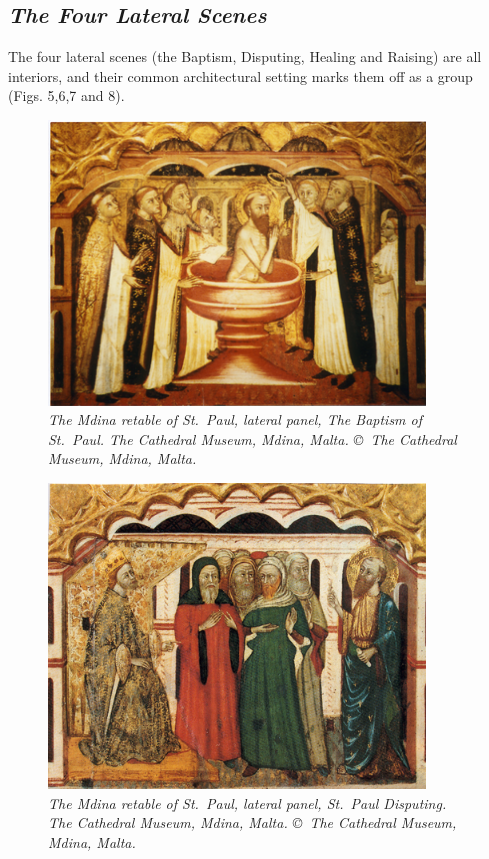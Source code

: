 \documentclass[a4paper,12pt]{article}
\begin{document}
\subsection{\textit{The Four Lateral Scenes}}

The four lateral scenes (the Baptism, Disputing, Healing and Raising)
are all interiors, and their common architectural setting marks them
off as a group (Figs. 5,6,7 and 8). 
\begin{figure}[htbp]
\centering
\includegraphics[width=10cm]{pics/fig5.png}
\caption[The Mdina retable of St.~Paul, lateral panel, The Baptism
  of St.~Paul]
{\it The Mdina retable of St.~Paul, lateral panel, The Baptism
  of St.~Paul. 
The Cathedral Museum, Mdina, Malta. \copyright\ The Cathedral Museum,
  Mdina, Malta.} 
\end{figure}
\begin{figure}[htbp]
\centering
\includegraphics[width=10cm]{pics/fig6.png}
\caption[The Mdina retable of St.~Paul, lateral panel, St.~Paul
  Disputing]
{\it The Mdina retable of St.~Paul, lateral panel, St.~Paul Disputing.
The Cathedral Museum, Mdina, Malta. \copyright\ The Cathedral Museum,
  Mdina, Malta.} 
\end{figure}
\end{document}
